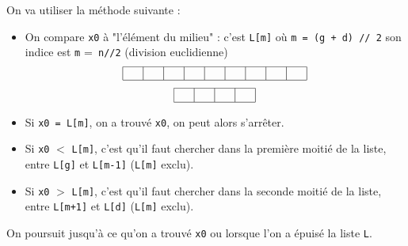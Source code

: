 On va utiliser la méthode suivante :
\begin{itemize}
\item On compare \texttt{x0} à "l'élément du milieu" : c'est \texttt{L[m]} où \texttt{m = (g + d) // 2}
son indice est \texttt{m} =\texttt{ n//2} (division euclidienne)
$$\begin{array}{|c|c|c|c|c|c|c|c|c|} 
\hline \hspace*{3mm} & \hspace*{3mm} & \hspace*{3mm} &  \hspace*{3mm} & \hspace*{3mm} & \hspace*{3mm} & \hspace*{3mm} & \hspace*{3mm} & \hspace*{3mm}\\ \hline
\end{array}$$
\medskip
$$\begin{array}{|c|c|c|c|} 
\hline \hspace*{3mm} & \hspace*{3mm} & \hspace*{3mm} &  \hspace*{3mm} \\ \hline
\end{array}$$

\item Si \texttt{x0 = L[m]}, on a trouvé \texttt{x0}, on peut alors s'arrêter.
\item Si \texttt{x0} $<$ \texttt{L[m]}, c'est qu'il faut chercher dans la première moitié de la liste, entre \texttt{L[g]} et  \texttt{L[m-1]} (\texttt{L[m]} exclu).
\item Si \texttt{x0} $>$ \texttt{L[m]}, c'est qu'il faut chercher dans la seconde moitié de la liste, entre \texttt{L[m+1]} et \texttt{L[d]} (\texttt{L[m]} exclu).
\end{itemize}

On poursuit jusqu'à ce qu'on a trouvé \texttt{x0} ou lorsque l'on a épuisé la liste \texttt{L}.





